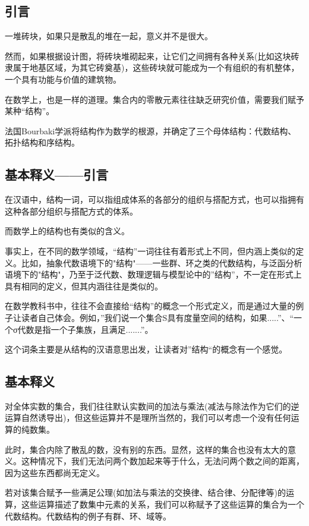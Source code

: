 

\subsection{引言}
一堆砖块，如果只是散乱的堆在一起，意义并不是很大。

然而，如果根据设计图，将砖块堆砌起来，让它们之间拥有各种关系(比如这块砖隶属于地基区域，为其它砖奠基)，这些砖块就可能成为一个有组织的有机整体，一个具有功能与价值的建筑物。

在数学上，也是一样的道理。集合内的零散元素往往缺乏研究价值，需要我们赋予某种“结构”。

法国Bourbaki学派将结构作为数学的根源，并确定了三个母体结构：代数结构、拓扑结构和序结构。

\subsection{基本释义——引言}
在汉语中，结构一词，可以指组成体系的各部分的组织与搭配方式，也可以指拥有这种各部分组织与搭配方式的体系。

而数学上的结构也有类似的含义。

事实上，在不同的数学领域，“结构”一词往往有着形式上不同，但内涵上类似的定义。比如，抽象代数语境下的"结构"——一些群、环之类的代数结构，与泛函分析语境下的"结构"，乃至于泛代数、数理逻辑与模型论中的”结构”，不一定在形式上具有相同的定义，但其内涵往往是类似的。

在数学教科书中，往往不会直接给“结构”的概念一个形式定义，而是通过大量的例子让读者自己体会。例如，”我们说一个集合S具有度量空间的结构，如果.....”、“一个σ代数是指一个子集族，且满足.......”。

这个词条主要是从结构的汉语意思出发，让读者对”结构“的概念有一个感觉。

\subsection{基本释义}

对全体实数的集合，我们往往默认实数间的加法与乘法(减法与除法作为它们的逆运算自然诱导出)，但这些运算并不是理所当然的，我们可以考虑一个没有任何运算的纯数集。

此时，集合内除了散乱的数，没有别的东西。显然，这样的集合也没有太大的意义。这种情况下，我们无法问两个数加起来等于什么，无法问两个数之间的距离，因为这些东西都尚无定义。 

若对该集合赋予一些满足公理(如加法与乘法的交换律、结合律、分配律等)的运算，这些运算描述了数集中元素的关系，我们可以称赋予了这些运算的集合为一个代数结构。代数结构的例子有群、环、域等。

